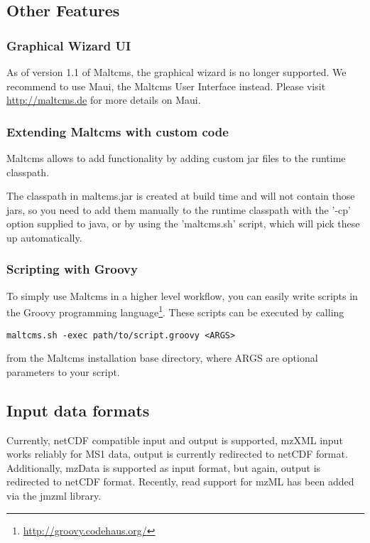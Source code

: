 \subsection{Other Features}

\subsubsection{Graphical Wizard UI}
As of version 1.1 of Maltcms, the graphical wizard is no longer 
supported. We recommend to use Maui, the Maltcms User Interface instead.
Please visit \url{http://maltcms.de} for more details on Maui.

\subsubsection{Extending Maltcms with custom code}
Maltcms allows to add functionality by adding custom jar files
to the runtime classpath.

The classpath in maltcms.jar is created at 
build time and will not contain those jars, so you need to add them
manually to the runtime classpath with the '-cp' option supplied to
java, or by using the 'maltcms.sh' script, which will pick these up
automatically.

\subsubsection{Scripting with Groovy}

To simply use Maltcms in a higher level workflow, you can easily write
scripts in the Groovy programming language\footnote{\url{http://groovy.codehaus.org/}}.
These scripts can be executed by calling 

\begin{lstlisting}[style=script]
maltcms.sh -exec path/to/script.groovy <ARGS>
\end{lstlisting}

from the Maltcms installation base directory, where ARGS are optional
parameters to your script.

\subsection{Input data formats}
Currently, netCDF compatible input and output is 
supported, mzXML input works reliably for MS1 data, output is
currently redirected to netCDF format. Additionally, mzData is 
supported as input format, but again, output is redirected to netCDF
format. Recently, read support for mzML has been added via the jmzml 
library.

